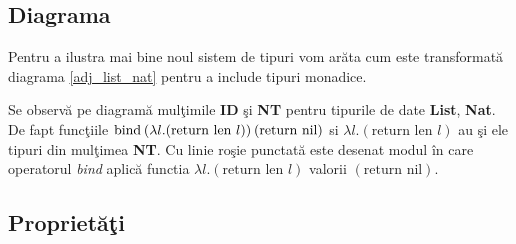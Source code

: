 \subsection{Diagrama}
Pentru a ilustra mai bine noul sistem de tipuri vom ar\u ata cum este transformat\u a diagrama \ref{adj_list_nat} pentru a include tipuri monadice.
\done{}
\begin{center}

\end{center}
Se observ\u a pe diagram\u a mul\c timile \textbf{ID} \c si \textbf{NT} pentru tipurile de date \textbf{List}, \textbf{Nat}. De fapt func\c tiile $\text{bind}\hspace{2pt} (\lambda l . (\text{return len }l))\hspace{2pt} (\text{return nil}) $ si $\lambda l . (\text{return len }l)$ au \c si ele tipuri din mul\c timea \textbf{NT}. Cu linie ro\c sie punctat\u a este desenat modul \^ in care operatorul \emph{bind} aplic\u a functia $\lambda l . (\text{return len }l)$ valorii $(\text{return nil})$.

\subsection{Propriet\u a\c ti}

